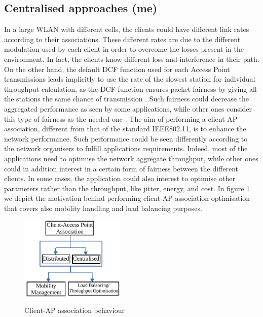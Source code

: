\documentclass[journal,transmag]{IEEEtran}
\begin{document}
\subsection{Centralised approaches (me)}
In a large WLAN with different cells, the clients could have different link rates according to their associations. These different rates are due to the different modulation used by each client in order to overcome the losses present in the environment. In fact, the clients know different loss and interference in their path. On the other hand, the default DCF function used for each Access Point transmissions leads implicitly to use the rate of the slowest station for individual throughput calculation, as the DCF function ensures packet fairness by giving all the stations the same chance of transmission \cite{03performance_anomaly_DCF}. Such fairness could decrease the aggregated performance as seen by some applications, while other ones consider this type of fairness as the needed one \cite{05performance_time_throughput_fairness}.
The aim of performing a client AP association, different from that of the standard IEEE802.11, is to enhance the network performance. Such performance could be seen differently according to the network organisers to fulfill applications requirements. Indeed, most of the applications need to optimise the network aggregate throughput, while other ones could in addition interest in a certain form of fairness between the different clients. In some cases, the application could also interest to optimise other parameters rather than the throughput, like jitter, energy, and cost. 
In figure \ref{client_AP_association} we depict the motivation behind performing client-AP association optimisation that covers also mobility handling and load balancing purposes. \\

\begin{figure}[t]
\centering
\includegraphics[width=5cm]{Figures/client_AP_association.pdf}
\caption{Client-AP association behaviour}
\label{client_AP_association}
\end{figure}
\end{document}
